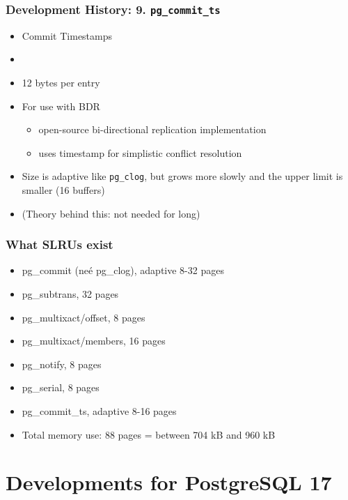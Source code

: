 \begin{frame}
  \frametitle{Development History: 9. \texttt{pg\_commit\_ts}}
  \begin{itemize}
    \item Commit Timestamps
     \item {}
     \item 12 bytes per entry
     \item For use with BDR
       \begin{itemize}
	 \item open-source bi-directional replication implementation
	 \item uses timestamp for simplistic conflict resolution
       \end{itemize}
     \item Size is adaptive like \texttt{pg\_clog}, but grows more slowly and the upper limit is smaller (16 buffers)
     \item (Theory behind this: not needed for long)
  \end{itemize}
\end{frame}

\begin{frame}
   \frametitle{What SLRUs exist}

   \begin{itemize}
      \item pg\_commit (neé pg\_clog), adaptive 8-32 pages
      \item pg\_subtrans, 32 pages
      \item pg\_multixact/offset, 8 pages
      \item pg\_multixact/members, 16 pages
      \item pg\_notify, 8 pages
      \item pg\_serial, 8 pages
      \item pg\_commit\_ts, adaptive 8-16 pages
      \item Total memory use: 88 pages = between 704 kB and 960 kB
   \end{itemize}
\end{frame}

\section{Developments for PostgreSQL 17}
\begin{frame}
  \sectionpage
\end{frame}


